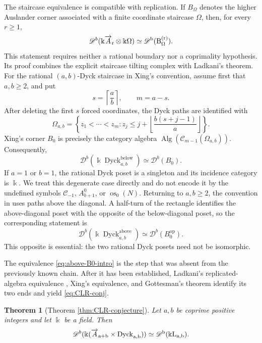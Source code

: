 \documentclass[12pt,a4paper,english,reqno]{amsart}
\theoremstyle{plain}
\newtheorem{theorem}{Theorem}[section]
\theoremstyle{definition}
\newcommand{\kk}{\Bbbk}
\newcommand{\Dyck}{\operatorname{Dyck}}
\newcommand{\op}{\mathrm{op}}
\newcommand{\C}{\mathcal C}
\newcommand{\Db}[1]{{\mathscr D}^b(#1)}
\newcommand{\ovr}{\rm \overrightarrow}
\begin{document}
The staircase equivalence is compatible with replication.  If
$B_\Omega$ denotes the higher Auslander corner associated with a finite
coordinate staircase $\Omega$, then, for every $r\geq1$,
\begin{equation}
 \Db{\kk\ovr A_r\otimes\kk\Omega}\simeq\Db{B_\Omega^{(r)}}.
\label{eq:intro-replicated-staircase}
\end{equation}
This statement requires neither a rational boundary nor a coprimality
hypothesis.  Its proof combines the explicit staircase tilting complex with
Ladkani's theorem.  For the rational $(a,b)$-Dyck staircase in Xing's
convention, assume first that $a,b\geq2$, and put
\[
 s=\left\lceil\frac ab\right\rceil,\qquad m=a-s.
\]
After deleting the first $s$ forced coordinates, the Dyck paths are
identified with
\[
 \Omega_{a,b}=
 \left\{z_1<\cdots<z_m:
 z_j\leq j+\left\lfloor\frac{b(s+j-1)}a\right\rfloor
 \right\}.
\]
Xing's corner $B_0$ is precisely the category algebra
$\operatorname{Alg}(\C_{m-1}(\Omega_{a,b}))$. Consequently,
\begin{equation}
 \Db{\kk\Dyck^{\mathrm{below}}_{a,b}}
 \simeq\Db{B_0}.
\label{eq:dyck-B0-intro}
\end{equation}
If $a=1$ or $b=1$, the rational Dyck poset is a singleton and its
incidence category is $\kk$.  We treat this degenerate case directly
and do not encode it by the undefined symbols
$\C_{-1}$, $A_{b+1}^{0}$, or $\operatorname{os}_0(N)$.
Returning to $a,b\ge 2$, the convention in \cite{CLR} uses paths above the
diagonal.  A half-turn of
the rectangle identifies the above-diagonal poset with the opposite of the
below-diagonal poset, so the corresponding statement is
\begin{equation}
 \Db{\kk\Dyck^{\mathrm{above}}_{a,b}}
 \simeq\Db{B_0^{\op}}.
\label{eq:above-B0-intro}
\end{equation}
This opposite is essential: the two rational Dyck posets need not be
isomorphic.

The equivalence \eqref{eq:above-B0-intro} is the step that was absent from the
previously known chain.  After it has been established, Ladkani's
replicated-algebra equivalence \cite[Corollary~1.3]{Ladkani}, Xing's
equivalence, and Gottesman's theorem identify its two ends and yield
\eqref{eq:CLR-conj}.

\begin{theorem}[Theorem \ref{thm:CLR-conjecture}]
\label{thm:intro-conjecture}
Let $a,b$ be coprime positive integers and let $\kk$ be a field.
Then
\[
 \Db{\kk(\ovr A_{a+b}\times\Dyck_{a,b})}\simeq \Db{\kk L_{a,b}}.
\]
\end{theorem}
\end{document}
